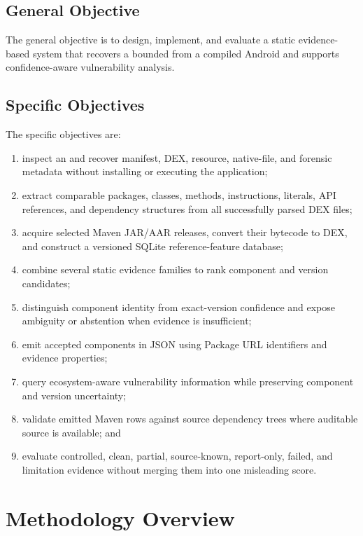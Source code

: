\subsection{General Objective}

The general objective is to design, implement, and evaluate a static
evidence-based system that recovers a bounded \CycloneDX \SBOM from a compiled
Android \APK and supports confidence-aware vulnerability analysis.

\subsection{Specific Objectives}

The specific objectives are:

\begin{enumerate}
  \item inspect an \APK and recover manifest, DEX, resource, native-file, and
  forensic metadata without installing or executing the application;
  \item extract comparable packages, classes, methods, instructions, literals,
  API references, and dependency structures from all successfully parsed DEX
  files;
  \item acquire selected Maven JAR/AAR releases, convert their bytecode to DEX,
  and construct a versioned SQLite reference-feature database;
  \item combine several static evidence families to rank component and version
  candidates;
  \item distinguish component identity from exact-version confidence and
  expose ambiguity or abstention when evidence is insufficient;
  \item emit accepted components in \CycloneDX JSON using Package URL
  identifiers and evidence properties;
  \item query ecosystem-aware vulnerability information while preserving
  component and version uncertainty;
  \item validate emitted Maven rows against source dependency trees where
  auditable source is available; and
  \item evaluate controlled, clean, partial, source-known, report-only,
  failed, and limitation evidence without merging them into one misleading
  score.
\end{enumerate}

\section{Methodology Overview}

